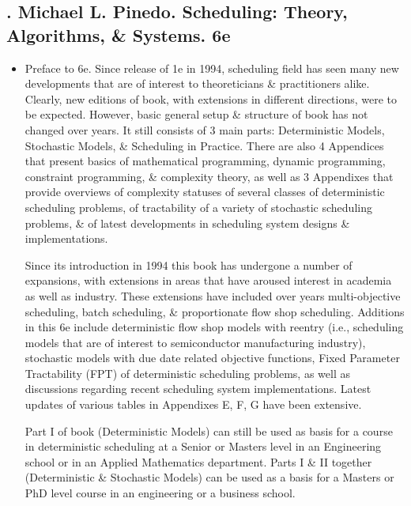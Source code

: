 \documentclass{article}
\begin{document}

\subsection{\cite{Pinedo2022}. {\sc Michael L. Pinedo}. Scheduling: Theory, Algorithms, \& Systems. 6e}

\begin{itemize}
    \item {\sf Preface to 6e.} Since release of 1e in 1994, scheduling field has seen many new developments that are of interest to theoreticians \& practitioners alike. Clearly, new editions of book, with extensions in different directions, were to be expected. However, basic general setup \& structure of book has not changed over years. It still consists of 3 main parts: Deterministic Models, Stochastic Models, \& Scheduling in Practice. There are also 4 Appendices that present basics of mathematical programming, dynamic programming, constraint programming, \& complexity theory, as well as 3 Appendixes that provide overviews of complexity statuses of several classes of deterministic scheduling problems, of tractability of a variety of stochastic scheduling problems, \& of latest developments in scheduling system designs \& implementations.

    Since its introduction in 1994 this book has undergone a number of expansions, with extensions in areas that have aroused interest in academia as well as industry. These extensions have included over years multi-objective scheduling, batch scheduling, \& proportionate flow shop scheduling. Additions in this 6e include deterministic flow shop models with reentry (i.e., scheduling models that are of interest to semiconductor manufacturing industry), stochastic models with due date related objective functions, Fixed Parameter Tractability (FPT) of deterministic scheduling problems, as well as discussions regarding recent scheduling system implementations. Latest updates of various tables in Appendixes E, F, G have been extensive.

    Part I of book (Deterministic Models) can still be used as basis for a course in deterministic scheduling at a Senior or Masters level in an Engineering school or in an Applied Mathematics department. Parts I \& II together (Deterministic \& Stochastic Models) can be used as a basis for a Masters or PhD level course in an engineering or a business school.


\end{itemize}
\end{document}
